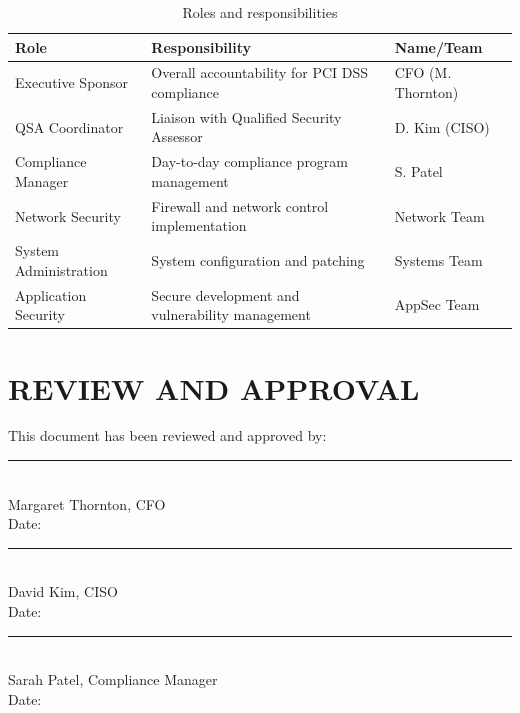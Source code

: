 \documentclass[
    language=english,
    doctype=compliance-document,
    institution=none,
]{../../omnilatex}
\begin{document}
\begin{table}[h]
\centering
\small
\begin{tabular}{p{3cm}p{5cm}p{5cm}}
\toprule
\textbf{Role} & \textbf{Responsibility} & \textbf{Name/Team} \\
\midrule
Executive Sponsor & Overall accountability for PCI DSS compliance & CFO (M. Thornton) \\
QSA Coordinator & Liaison with Qualified Security Assessor & D. Kim (CISO) \\
Compliance Manager & Day-to-day compliance program management & S. Patel \\
Network Security & Firewall and network control implementation & Network Team \\
System Administration & System configuration and patching & Systems Team \\
Application Security & Secure development and vulnerability management & AppSec Team \\
\bottomrule
\end{tabular}
\caption{Roles and responsibilities}
\end{table}

\section{REVIEW AND APPROVAL}

This document has been reviewed and approved by:

\vspace{1cm}

\noindent\rule{5cm}{0.4pt}\\
Margaret Thornton, CFO\\
Date: \underline{\hspace{3cm}}

\vspace{1cm}

\noindent\rule{5cm}{0.4pt}\\
David Kim, CISO\\
Date: \underline{\hspace{3cm}}

\vspace{1cm}

\noindent\rule{5cm}{0.4pt}\\
Sarah Patel, Compliance Manager\\
Date: \underline{\hspace{3cm}}
\end{document}
